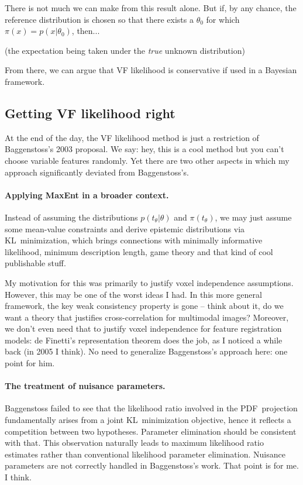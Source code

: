 \documentclass[english]{scrartcl}
\begin{document}
There is not much we can make from this result alone. But if, by any chance, the reference distribution is chosen so that there exists a $\theta_0$ for which $\pi(x)=p(x|\theta_0)$, then...

(the expectation being taken under the {\em true} unknown distribution)


From there, we can argue that VF likelihood is conservative if used in a Bayesian framework.

\subsection{Getting VF likelihood right}

At the end of the day, the VF likelihood method is just a restriction of Baggenstoss's 2003 proposal. We say: hey, this is a cool method but you can't choose variable features randomly. Yet there are two other aspects in which my approach significantly deviated from Baggenstoss's.

\paragraph{Applying MaxEnt in a broader context.} Instead of assuming the distributions $p(t_\theta|\theta)$ and $\pi(t_\theta)$, we may just assume some mean-value constraints and derive epistemic distributions via KL~minimization, which brings connections with minimally informative likelihood, minimum description length, game theory and that kind of cool publishable stuff.

My motivation for this was primarily to justify voxel independence assumptions. However, this may be one of the worst ideas I had. In this more general framework, the key weak consistency property is gone -- think about it, do we want a theory that justifies cross-correlation for multimodal images? Moreover, we don't even need that to justify voxel independence for feature registration models: de Finetti's representation theorem does the job, as I noticed a while back (in 2005 I think). No need to generalize Baggenstoss's approach here: one point for him.

\paragraph{The treatment of nuisance parameters.} Baggenstoss failed to see that the likelihood ratio involved in the PDF~projection fundamentally arises from a joint KL~minimization objective, hence it reflects a competition between two hypotheses. Parameter elimination should be consistent with that. This observation naturally leads to maximum likelihood ratio estimates rather than conventional likelihood parameter elimination. Nuisance parameters are not correctly handled in Baggenstoss's work. That point is for me. I think.
\end{document}
